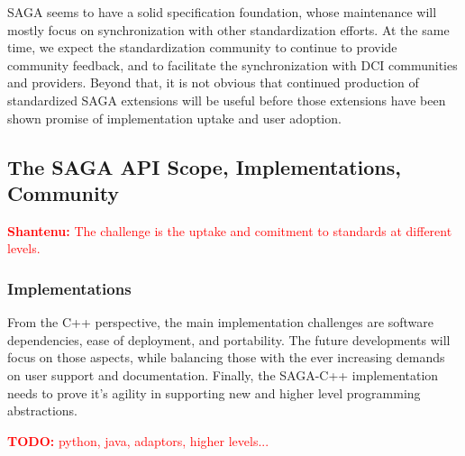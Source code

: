 \documentclass[]{article}
\newcommand{\B}[1]{\textbf{#1}}
\newcommand{\todo}[1]{{\textcolor{red}{\B{TODO:} #1 }}}
\newcommand{\jhanote}[1]{{\textcolor{red}{     \B{Shantenu:} #1 }}}
\newcommand{\todo}[1]{}
\newcommand{\jhanote}[1]{}
\begin{document}
  SAGA seems to have a solid specification foundation, whose maintenance
  will mostly focus on synchronization with other standardization
  efforts.  At the same time, we expect the standardization community to
  continue to provide community feedback, and to facilitate the
  synchronization with DCI communities and providers.  Beyond that, it
  is not obvious that continued production of standardized SAGA
  extensions will be useful before those extensions have been shown
  promise of implementation uptake and user adoption.  

  
 \subsection{The SAGA API Scope, Implementations, Community}

 \jhanote{The challenge is the uptake and comitment to standards at
   different levels.}

 \subsubsection{Implementations}

  From the C++ perspective, the main implementation challenges are
  software dependencies, ease of deployment, and portability.  The
  future developments will focus on those aspects, while balancing those
  with the ever increasing demands on user support and documentation.
  Finally, the SAGA-C++ implementation needs to prove it's agility in
  supporting new and higher level programming abstractions. 

  \todo{python, java, adaptors, higher levels...}


\end{document}
